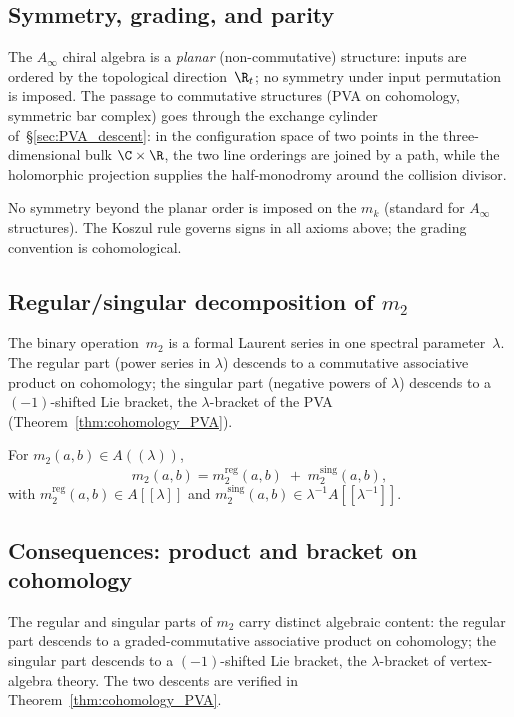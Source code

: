 \subsection{Symmetry, grading, and parity}
\label{subsec:symmetry}

The $A_\infty$ chiral algebra is a \emph{planar} (non-commutative) structure: inputs are ordered by the topological direction~$\R_t$; no symmetry under input permutation is imposed. The passage to commutative structures (PVA on cohomology, symmetric bar complex) goes through the exchange cylinder of~\S\ref{sec:PVA_descent}: in the configuration space of two points in the three-dimensional bulk $\C\times\R$, the two line orderings are joined by a path, while the holomorphic projection supplies the half-monodromy around the collision divisor.

\begin{definition}
\label{def:symmetry-grading}
No symmetry beyond the planar order is imposed on the $m_k$ (standard for $A_\infty$ structures). The Koszul rule governs signs in all axioms above; the grading convention is cohomological.
\end{definition}

\subsection{Regular/singular decomposition of $m_2$}
\label{subsec:reg-sing}
\label{def:Laurent-projection}

The binary operation~$m_2$ is a formal Laurent series in one spectral
parameter~$\lambda$. The regular part (power series in $\lambda$)
descends to a commutative associative product on cohomology; the
singular part (negative powers of $\lambda$) descends to a
$(-1)$-shifted Lie bracket, the $\lambda$-bracket of the PVA
(Theorem~\ref{thm:cohomology_PVA}).

For $m_2(a,b)\in A((\lambda))$,
\[
m_2(a,b) = m_2^{\mathrm{reg}}(a,b)\;+\;m_2^{\mathrm{sing}}(a,b),
\]
with $m_2^{\mathrm{reg}}(a,b)\in A[\![\lambda]\!]$ and $m_2^{\mathrm{sing}}(a,b)\in \lambda^{-1}A[\![\lambda^{-1}]\!]$.

\subsection{Consequences: product and bracket on cohomology}
\label{subsec:product-bracket}
\label{def:product}
\label{def:lambda-bracket}

The regular and singular parts of $m_2$ carry distinct algebraic
content: the regular part descends to a graded-commutative
associative product on cohomology; the singular part descends to a
$(-1)$-shifted Lie bracket, the $\lambda$-bracket of vertex-algebra
theory. The two descents are verified in
Theorem~\textup{\ref{thm:cohomology_PVA}}.

